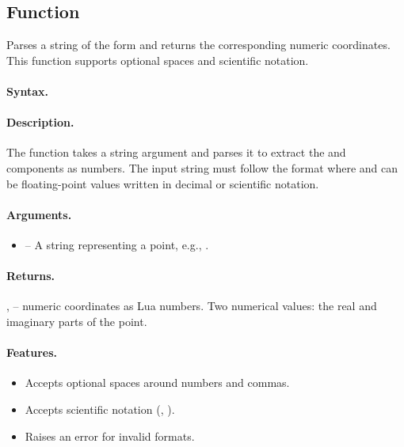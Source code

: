 \subsection{Function } %
\label{sub:function_utils_parse_point}

Parses a string of the form  and returns the corresponding numeric coordinates. This function supports optional spaces and scientific notation.

\paragraph{Syntax.}
\begin{center}
\end{center}

\paragraph{Description.}
The function takes a string argument and parses it to extract the  and  components as numbers. The input string must follow the format  where  and  can be floating-point values written in decimal or scientific notation.

\paragraph{Arguments.}
\begin{itemize}
\item {} – A string representing a point, e.g., .
\end{itemize}

\paragraph{Returns.}
,  – numeric coordinates as Lua numbers.
Two numerical values: the real and imaginary parts of the point.

\paragraph{Features.}
\begin{itemize}
\item Accepts optional spaces around numbers and commas.
\item Accepts scientific notation (, ).
\item Raises an error for invalid formats.
\end{itemize}


